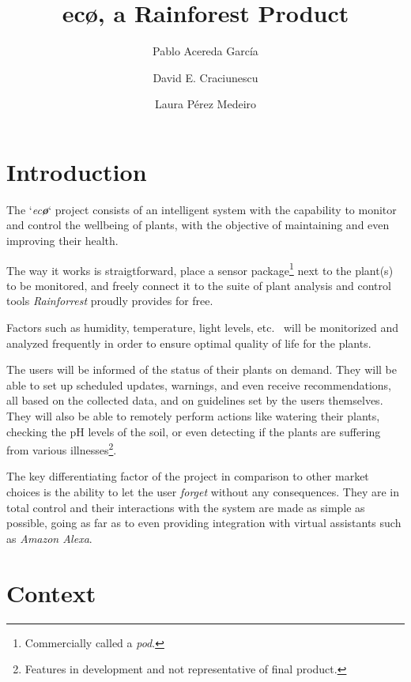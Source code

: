 \documentclass[english,runningheads,a4paper]{llncs}[2018/03/10]
\title{ec\textbf{\o}, a Rainforest Product}
\author{
    Pablo Acereda García \and
    David E. Craciunescu \and
    Laura Pérez Medeiro
}
\begin{document}
\maketitle


\section*{Introduction}

The `\textit{ec\textbf{\o}}` project consists of an intelligent system with the
capability to monitor and control the wellbeing of plants, with the objective of
maintaining and even improving their health.

The way it works is straigtforward, place a sensor package\footnote{Commercially
called a \textit{pod}.} next to the plant(s) to be monitored, and freely connect
it to the suite of plant analysis and control tools \textit{Rainforrest} proudly
provides for free.

Factors such as humidity, temperature, light levels, etc. \ will be monitorized
and analyzed frequently in order to ensure optimal quality of life for the
plants.

The users will be informed of the status of their plants on demand. They will be
able to set up scheduled updates, warnings, and even receive recommendations,
all based on the collected data, and on guidelines set by the users themselves.
They will also be able to remotely perform actions like watering their plants,
checking the pH levels of the soil, or even detecting if the plants are
suffering from various illnesses\footnote{Features in development and not
representative of final product.}.

The key differentiating factor of the project in comparison to other market
choices is the ability to let the user \textit{forget} without any consequences.
They are in total control and their interactions with the system are made as
simple as possible, going as far as to even providing integration with virtual
assistants such as \textit{Amazon Alexa}.


\section*{Context}

\end{document}
